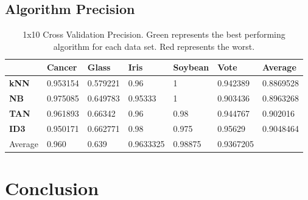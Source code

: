 \documentclass{article}
\begin{document}
	\subsection{Algorithm Precision}
		\begin{table} \centering
			
			\begin{tabular}  { | l | l | l | l | l | l | l | }
				\hline
			\rowcolor{gray}	& \textbf{Cancer} & \textbf{Glass} & \textbf{Iris} & \textbf{Soybean} & \textbf{Vote} & Average \\
				\hline
				\cellcolor{gray} \textbf{kNN} & 0.953154  & \cellcolor{red}0.579221 & 0.96 & \cellcolor{green}1 & 0.942389 & \cellcolor{red}0.8869528  \\
				\hline
			\cellcolor{gray}	\textbf{NB} & \cellcolor{green}0.975085 & 0.649783 &\cellcolor{red} 0.95333 & \cellcolor{green}1 & \cellcolor{red}0.903436 & \cellcolor{lightgray}0.8963268   \\
				\hline
			\cellcolor{gray}	\textbf{TAN} & 0.961893 & \cellcolor{green}0.66342 & 0.96 & 0.98 & 0.944767 & \cellcolor{lightgray}0.902016 \\
				\hline
			\cellcolor{gray}	\textbf{ID3} & \cellcolor{red}0.950171 & 0.662771 & \cellcolor{green}0.98 & \cellcolor{red}0.975 & \cellcolor{green}0.95629 & \cellcolor{green}0.9048464 \\
				\hline
			\rowcolor{lightgray}	\cellcolor{gray} Average & 0.960 & 0.639 & 0.9633325 & 0.98875 & 0.9367205 & \\
				\hline
				
			\end{tabular}
			\caption{1x10 Cross Validation Precision. Green represents the best performing algorithm for each data set. Red represents the worst.}
			\label{table}
		\end{table}
\section{Conclusion}
	

	\pagebreak


	
	
	
\end{document}
